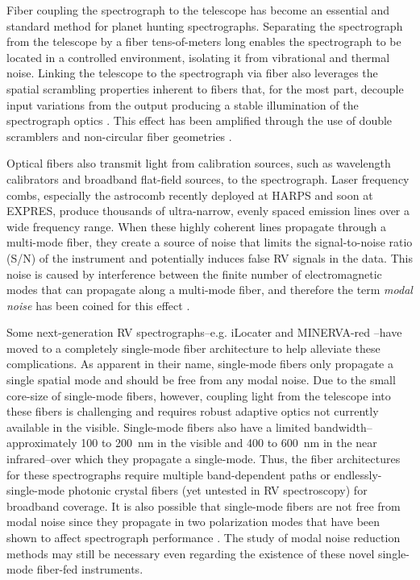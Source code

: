 \documentclass[twocolumn]{emulateapj}
\begin{document}
Fiber coupling the spectrograph to the telescope has become an essential and standard method for planet hunting spectrographs. Separating the spectrograph from the telescope by a fiber tens-of-meters long enables the spectrograph to be located in a controlled environment, isolating it from vibrational and thermal noise. Linking the telescope to the spectrograph via fiber also leverages the spatial scrambling properties inherent to fibers that, for the most part, decouple input variations from the output producing a stable illumination of the spectrograph optics \citep{Hunter1992}. This effect has been amplified through the use of double scramblers \citep{Halverson2015a, Spronck2015} and non-circular fiber geometries \citep{Chazelas2010, Spronck2012, Plavchan2013}.

Optical fibers also transmit light from calibration sources, such as wavelength calibrators and broadband flat-field sources, to the spectrograph. Laser frequency combs, especially the  astrocomb \citep{Probst2014} recently deployed at HARPS and soon at EXPRES, produce thousands of ultra-narrow, evenly spaced emission lines over a wide frequency range. When these highly coherent lines propagate through a multi-mode fiber, they create a source of noise that limits the signal-to-noise ratio (S/N) of the instrument and potentially induces false RV signals in the data. This noise is caused by interference between the finite number of electromagnetic modes that can propagate along a multi-mode fiber, and therefore the term \textit{modal noise} has been coined for this effect \citep{Epworth1978}.

Some next-generation RV spectrographs--e.g. iLocater \citep{Crepp2016} and MINERVA-red \citep{Blake2015}--have moved to a completely single-mode fiber architecture to help alleviate these complications. As apparent in their name, single-mode fibers only propagate a single spatial mode and should be free from any modal noise. Due to the small core-size of single-mode fibers, however, coupling light from the telescope into these fibers is challenging and requires robust adaptive optics not currently available in the visible. Single-mode fibers also have a limited bandwidth--approximately 100 to \SI{200}{\nano\meter} in the visible and 400 to \SI{600}{\nano\meter} in the near infrared--over which they propagate a single-mode. Thus, the fiber architectures for these spectrographs require multiple band-dependent paths or endlessly-single-mode photonic crystal fibers (yet untested in RV spectroscopy) for broadband coverage. It is also possible that single-mode fibers are not free from modal noise since they propagate in two polarization modes that have been shown to affect spectrograph performance \citep{Halverson2015b}. The study of modal noise reduction methods may still be necessary even regarding the existence of these novel single-mode fiber-fed instruments.
\end{document}
